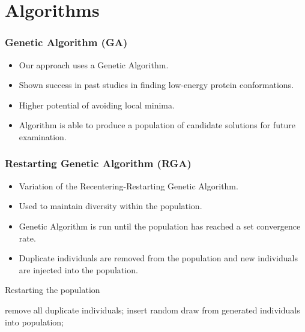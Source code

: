 \documentclass[10pt]{beamer}
\begin{document}
\section{Algorithms}

\begin{frame}
	\frametitle{Genetic Algorithm (GA)}

	\begin{itemize}
		\item Our approach uses a Genetic Algorithm.
		\item Shown success in past studies in finding low-energy protein conformations.
		\item Higher potential of avoiding local minima.
		\item Algorithm is able to produce a population of candidate solutions for future examination.
	\end{itemize}

\end{frame}

\begin{frame}
	\frametitle{Restarting Genetic Algorithm (RGA)}

	\begin{itemize}
		\item Variation of the Recentering-Restarting Genetic Algorithm.
		\item Used to maintain diversity within the population.
		\item Genetic Algorithm is run until the population has reached a set convergence rate.
		\item Duplicate individuals are removed from the population and new individuals are injected into the population.
	\end{itemize}

	\begin{algorithm}[H]
		\caption{Restarting the population}
		\begin{algorithmic}[1]

		  \STATE remove all duplicate individuals;
		    \STATE insert random draw from generated individuals into population;
		  \ENDWHILE
		\ENDIF

		\end{algorithmic}
	\end{algorithm}

\end{frame}

\end{document}
